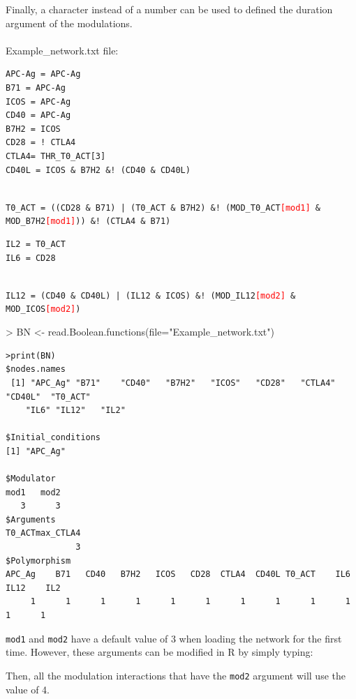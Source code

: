 \documentclass[a4paper]{article}
\begin{document}
Finally, a character instead of a number can be used to defined the duration argument of the modulations. \\ 
\\ Example\_network.txt file:
\begin{framed}
\begin{BVerbatim}
APC-Ag = APC-Ag
B71 = APC-Ag
ICOS = APC-Ag
CD40 = APC-Ag
B7H2 = ICOS
CD28 = ! CTLA4
CTLA4= THR_T0_ACT[3]
CD40L = ICOS & B7H2 &! (CD40 & CD40L)
\end{BVerbatim}
\\
\texttt{T0\_ACT = ((CD28 \& B71) | (T0\_ACT \& B7H2) \&! (MOD\_T0\_ACT\textcolor{red}{[mod1]} \& MOD\_B7H2\textcolor{red}{[mod1]})) \&! (CTLA4 \& B71)}\\
\begin{BVerbatim}
IL2 = T0_ACT
IL6 = CD28
\end{BVerbatim}
\\
\texttt{IL12 = (CD40 \& CD40L) | (IL12 \& ICOS) \&! (MOD\_IL12\textcolor{red}{[mod2]} \& MOD\_ICOS\textcolor{red}{[mod2]})}

\end{framed}
\begin{Schunk}
\begin{Sinput}
> BN <- read.Boolean.functions(file="Example_network.txt")
\end{Sinput}
\end{Schunk}
\begin{verbatim}
>print(BN)
$nodes.names
 [1] "APC_Ag" "B71"    "CD40"   "B7H2"   "ICOS"   "CD28"   "CTLA4"  "CD40L"  "T0_ACT" 
    "IL6" "IL12"   "IL2"
    
$Initial_conditions
[1] "APC_Ag"

$Modulator
mod1   mod2 
   3      3 
$Arguments
T0_ACTmax_CTLA4 
              3 
$Polymorphism
APC_Ag    B71   CD40   B7H2   ICOS   CD28  CTLA4  CD40L T0_ACT    IL6   IL12    IL2 
     1      1      1      1      1      1      1      1      1      1      1      1 

\end{verbatim}

\texttt{mod1} and \texttt{mod2} have a default value of 3 when loading the network for the first time. However, these arguments can be modified in R by simply typing:
\begin{Schunk}
\end{Schunk}
Then, all the modulation interactions that have the \texttt{mod2} argument will use the value of 4.
\end{document}
